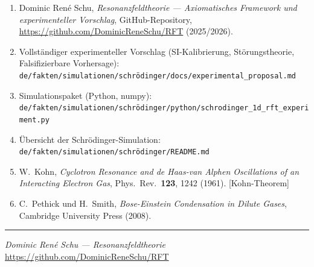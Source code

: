 \documentclass[a4paper,11pt]{article}
\begin{document}
\begin{enumerate}
  \item Dominic Ren\'e Schu, \textit{Resonanzfeldtheorie --- Axiomatisches
    Framework und experimenteller Vorschlag}, GitHub-Repository,
    \url{https://github.com/DominicReneSchu/RFT} (2025/2026).
  \item Vollständiger experimenteller Vorschlag (SI-Kalibrierung, Störungstheorie,
    Falsifizierbare Vorhersage):\\
    \texttt{de/fakten/simulationen/schrödinger/docs/experimental\_proposal.md}
  \item Simulationspaket (Python, numpy):\\
    \texttt{de/fakten/simulationen/schrödinger/python/schrodinger\_1d\_rft\_experiment.py}
  \item Übersicht der Schrödinger-Simulation:\\
    \texttt{de/fakten/simulationen/schrödinger/README.md}
  \item W.~Kohn, \textit{Cyclotron Resonance and de Haas-van Alphen
    Oscillations of an Interacting Electron Gas}, Phys.\ Rev.\ \textbf{123},
    1242 (1961). [Kohn-Theorem]
  \item C.~Pethick und H.~Smith, \textit{Bose-Einstein Condensation in
    Dilute Gases}, Cambridge University Press (2008).
\end{enumerate}

\vspace{2em}
\hrule
\vspace{1em}
\begin{center}
\small
\textit{Dominic Ren\'e Schu --- Resonanzfeldtheorie}\\
\href{https://github.com/DominicReneSchu/RFT}{https://github.com/DominicReneSchu/RFT}
\end{center}
\end{document}
